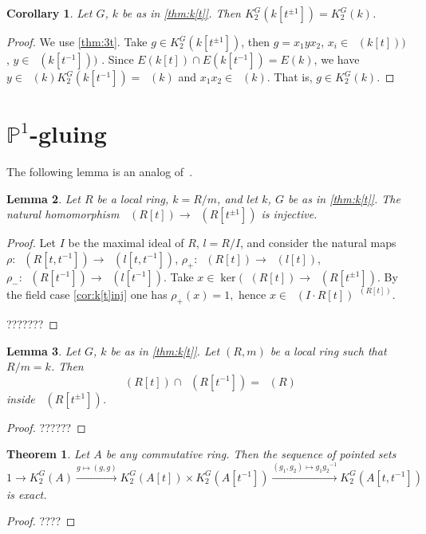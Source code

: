 \documentclass[oneside,12pt]{amsart}
\newtheorem{thm}{Theorem}
\numberwithin{equation}{section}
\newtheorem{lem}{Lemma}
\numberwithin{lem}{section}
\newtheorem{cor}[lem]{Corollary}
\theoremstyle{definition}
\theoremstyle{remark}
\DeclareMathOperator{\St}{St^G}
\newcommand{\Pro}{\mathbb {P}}
\newcommand{\st}{\scriptstyle}
\begin{document}
\begin{cor}
Let $G$, $k$ be as in \cref{thm:k[t]}. Then $K_2^G(k[t^{\pm 1}])=K_2^G(k)$.
\end{cor}
\begin{proof}
We use \cref{thm:3t}.
Take $g\in K_2^G(k[t^{\pm 1}])$,
then $g=x_1yx_2$, $x_i\in \St(k[t]))$, $y\in \St(k[t^{-1}]))$ .
Since $E(k[t])\cap E(k[t^{-1}])=E(k)$,
we have $y\in\St(k)K_2^G(k[t^{-1}])=\St(k)$ and $x_1x_2\in\St(k)$. That is, $g\in K_2^G(k)$.
\end{proof}

\section{$\Pro^1$-gluing}

The following lemma is an analog of~\cite[Proposition 4.3 (a)]{Tu}.

\begin{lem}
Let $R$ be a local ring, $k=R/m$, and let $k$, $G$ be as in \cref{thm:k[t]}.
The natural homomorphism $\St(R[t])\to\St(R[t^{\pm 1}])$ is injective.
\end{lem}
\begin{proof}
Let $I$ be the maximal ideal of $R$,
$l=R/I$, and consider the natural maps $\rho:\St(R[t,t^{-1}])\to \St(l[t,t^{-1}])$,
$\rho_+:\St(R[t])\to \St(l[t])$, $\rho_-:\St(R[t^{-1}])\to\St(l[t^{-1}])$.
Take $x\in \ker(\St(R[t])\to\St(R[t^{\pm 1}])$.
By the field case \cref{cor:k[t]inj} one has
$\rho_+(x)=1,$ hence $x\in\St(I\cdot R[t])^{\St(R[t])}$.

???????
\end{proof}

\begin{lem}
Let $G$, $k$ be as in \cref{thm:k[t]}.
Let $(R,m)$ be a local ring such that $R/m=k$.
Then
$$\St(R[t])\cap \St(R[t^{-1}])=\St(R)$$
inside $\St(R[t^{\pm 1}])$.
\end{lem}
\begin{proof}
??????
\end{proof}

\begin{thm}
Let $A$ be any commutative ring. Then the sequence of pointed sets
$$1\longrightarrow K_2^G(A)\xrightarrow{\st g\mapsto (g,g)} K_2^G(A[t])\times K_2^G(A[t^{-1}])
\xrightarrow{\st (g_1,g_2)\mapsto g_1{g_2}^{-1}} K_2^G(A[t,t^{-1}])$$
is exact.
\end{thm}
\begin{proof}
????
\end{proof}
\end{document}
